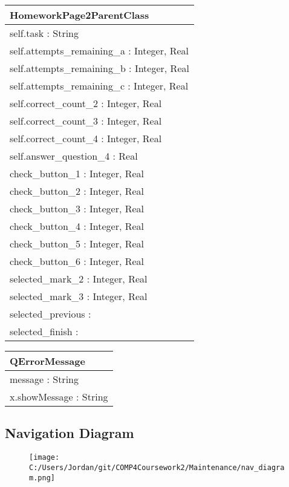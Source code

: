 \begin{center}
\begin{tabular}{|p{7cm}|} \hline
\textbf{HomeworkPage2ParentClass} \\ \hline
self.task : String \\
self.attempts\_remaining\_a : Integer, Real \\
self.attempts\_remaining\_b : Integer, Real \\
self.attempts\_remaining\_c : Integer, Real \\
self.correct\_count\_2 : Integer, Real \\
self.correct\_count\_3 : Integer, Real \\
self.correct\_count\_4 : Integer, Real \\
self.answer\_question\_4 : Real \\ \hline
check\_button\_1 : Integer, Real \\
check\_button\_2 : Integer, Real \\
check\_button\_3 : Integer, Real \\
check\_button\_4 : Integer, Real \\
check\_button\_5 : Integer, Real \\
check\_button\_6 : Integer, Real \\
selected\_mark\_2 : Integer, Real \\
selected\_mark\_3 : Integer, Real \\
selected\_previous : \\
selected\_finish : \\ \hline
\end{tabular}
\end{center}

\begin{center}
\begin{tabular}{|p{7cm}|} \hline
\textbf{QErrorMessage} \\ \hline
message : String \\ \hline
x.showMessage : String \\ \hline
\end{tabular}
\end{center}

\subsection{Navigation Diagram}

\begin{figure}[H]
    \texttt{[image: C:/Users/Jordan/git/COMP4Coursework2/Maintenance/nav\_diagram.png]}
    \label{fig:print_function_result}
\end{figure}


